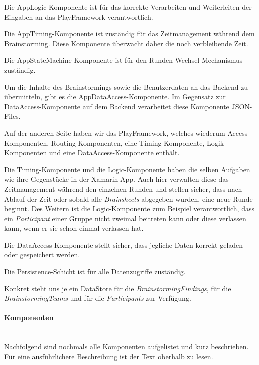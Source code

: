 Die AppLogic-Komponente ist für das korrekte Verarbeiten und Weiterleiten der Eingaben an das PlayFramework verantwortlich.

Die AppTiming-Komponente ist zuständig für das Zeitmanagement während dem Brainstorming. Diese Komponente überwacht daher die noch verbleibende Zeit.

Die AppStateMachine-Komponente ist für den Runden-Wechsel-Mechanismus zuständig. 

Um die Inhalte des Brainstormings sowie die Benutzerdaten an das Backend zu übermitteln, gibt es die AppDataAccess-Komponente. Im Gegensatz zur DataAccess-Komponente auf dem Backend verarbeitet diese Komponente JSON-Files. 

Auf der anderen Seite haben wir das PlayFramework, welches wiederum Access-Komponenten, Routing-Komponenten, eine Timing-Komponente, Logik-Komponenten und eine DataAccess-Komponente enthält.

Die Timing-Komponente und die Logic-Komponente haben die selben Aufgaben wie ihre Gegenstücke in der Xamarin App. Auch hier verwalten diese das Zeitmanagement während den einzelnen Runden und stellen sicher, dass nach Ablauf der Zeit oder sobald alle \textit{Brainsheets} abgegeben wurden, eine neue Runde beginnt. Des Weitern ist die Logic-Komponente zum Beispiel verantwortlich, dass ein \textit{Participant} einer Gruppe nicht zweimal beitreten kann oder diese verlassen kann, wenn er sie schon einmal verlassen hat. 

Die DataAccess-Komponente stellt sicher, dass jegliche Daten korrekt geladen oder gespeichert werden.

Die Persistence-Schicht ist für alle Datenzugriffe zuständig. 

Konkret steht uns je ein DataStore für die \textit{BrainstormingFindings}, für die \textit{BrainstormingTeams} und für die \textit{Participants} zur Verfügung.

\paragraph*{Komponenten}~\\

Nachfolgend sind nochmals alle Komponenten aufgelistet und kurz beschrieben. Für eine ausführlichere Beschreibung ist der Text oberhalb zu lesen.

